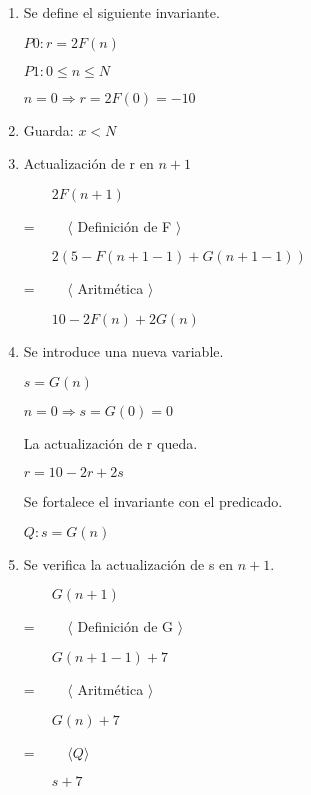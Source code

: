 \documentclass[hidelinks]{article}
\begin{document}
\begin{enumerate}
	\item Se define el siguiente invariante. \par
	      \begin{center}
		      $P0: r = 2 F(n)$ \par
		      $P1: 0\leq n \leq N$ \par
		      $n = 0 \Rightarrow r = 2F(0)=-10$ \par
	      \end{center}
	\item Guarda: $x<N$ \par
	\item Actualización de r en $n+1$ \par
	      $\qquad 2 F(n+1)$ \par
	      = $\qquad \langle$ Definición de F $\rangle$\par
	      $\qquad 2(5-F(n+1-1)+G(n+1-1))$ \par
	      = $\qquad \langle$ Aritmética $\rangle$\par
	      $\qquad 10-2F(n)+2G(n)$ \par

	\item Se introduce una nueva variable. \par
	      $s = G(n)$ \par
	      $n=0 \Rightarrow s = G(0)=0$ \par
	      La actualización de r queda. \par

	      \begin{center}
		      $r = 10 - 2r + 2s$ \par
	      \end{center}

	      Se fortalece el invariante con el predicado.
	      \begin{center}
		      $Q: s = G(n)$ \par
	      \end{center}

	\item Se verifica la actualización de s en $n+1$. \par
	      $\qquad G(n+1)$ \par
	      = $\qquad \langle$ Definición de G $\rangle$\par
	      $\qquad G(n+1-1)+7$ \par
	      = $\qquad \langle$ Aritmética $\rangle$\par
	      $\qquad G(n)+7$ \par
	      = $\qquad \langle Q \rangle$\par
	      $\qquad s+7$ \par


\end{enumerate}
\end{document}
